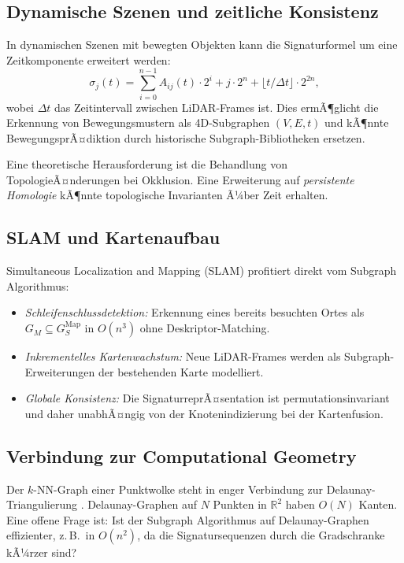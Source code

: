 ﻿\documentclass[a4paper,12pt]{article}
\theoremstyle{definition}
\begin{document}
\subsection{Dynamische Szenen und zeitliche Konsistenz}

In dynamischen Szenen mit bewegten Objekten kann die Signaturformel
um eine Zeitkomponente erweitert werden:
\[
  \sigma_j(t) = \sum_{i=0}^{n-1} A_{ij}(t) \cdot 2^i
                + j \cdot 2^n
                + \lfloor t / \Delta t \rfloor \cdot 2^{2n},
\]
wobei $\Delta t$ das Zeitintervall zwischen LiDAR-Frames ist.
Dies ermÃ¶glicht die Erkennung von Bewegungsmustern als
4D-Subgraphen $(V, E, t)$ und kÃ¶nnte BewegungsprÃ¤diktion durch
historische Subgraph-Bibliotheken ersetzen.

Eine theoretische Herausforderung ist die Behandlung von
TopologieÃ¤nderungen bei Okklusion. Eine Erweiterung auf
\emph{persistente Homologie} \citep{Edelsbrunner2002} kÃ¶nnte
topologische Invarianten Ã¼ber Zeit erhalten.

\subsection{SLAM und Kartenaufbau}

Simultaneous Localization and Mapping (SLAM) \citep{Durrant2006}
profitiert direkt vom Subgraph Algorithmus:

\begin{itemize}
  \item \emph{Schleifenschlussdetektion:} Erkennung eines bereits
        besuchten Ortes als $G_M \subseteq G_S^{\mathrm{Map}}$
        in $O(n^3)$ ohne Deskriptor-Matching.
  \item \emph{Inkrementelles Kartenwachstum:} Neue LiDAR-Frames
        werden als Subgraph-Erweiterungen der bestehenden Karte
        modelliert.
  \item \emph{Globale Konsistenz:} Die SignaturreprÃ¤sentation ist
        permutationsinvariant und daher unabhÃ¤ngig von der
        Knotenindizierung bei der Kartenfusion.
\end{itemize}

\subsection{Verbindung zur Computational Geometry}

Der $k$-NN-Graph einer Punktwolke steht in enger Verbindung zur
Delaunay-Triangulierung \citep{deBerg2008}. Delaunay-Graphen auf $N$
Punkten in $\mathbb{R}^2$ haben $O(N)$ Kanten. Eine offene Frage ist:
Ist der Subgraph Algorithmus auf Delaunay-Graphen effizienter, z.\,B.\
in $O(n^2)$, da die Signatursequenzen durch die Gradschranke kÃ¼rzer sind?
\end{document}
